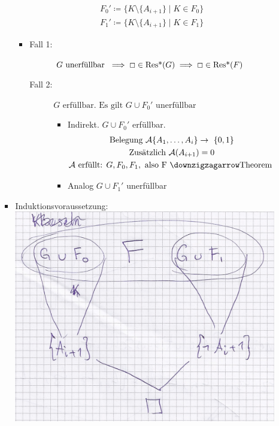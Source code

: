 \begin{enumerate}
\begin{itemize}
\begin{bew}
\begin{itemize}
\begin{itemize}
\begin{gather*}
								F_0' \coloneqq \{ K \setminus \{ A_{i+1} \} \mid K \in F_0 \} \\
								F_1' \coloneqq \{ K \setminus \{ A_{i+1} \} \mid K \in F_1 \}
							\end{gather*}
						\item
							\begin{description}
								\item[Fall 1:] $G \text{ unerfüllbar } \implies \Box \in \Resf( G ) \implies \Box \in \Resf( F )$
								\item[Fall 2:] $G \text{ erfüllbar. Es gilt } G \cup F_0' \text{ unerfüllbar}$
								\begin{itemize}
									\item Indirekt. $G \cup F_0'$ erfüllbar.
									\begin{gather*}
										\text{Belegung } \mathcal{A}\{ A_1 , \dotsc , A_i \} \rightarrow \{ 0 , 1 \} \\
										\text{Zusätzlich } \mathcal{A}( A_{i+1} ) = 0 \\
										\mathcal{A} \text{ erfüllt: } G , F_0 , F_1 , \text{ also F \lightning  Theorem }
									\end{gather*}
									\item Analog $G \cup F_1'$ unerfüllbar
								\end{itemize}
							\end{description}
					\end{itemize}
					\item Induktionsvoraussetzung: \\
						\includegraphics[width=\textwidth]{Bild13}
				\end{itemize}
			\end{bew}
	\end{itemize}
\end{enumerate}

